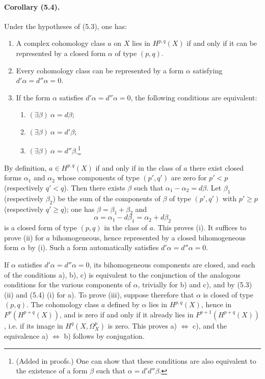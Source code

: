 \documentclass[10pt]{article}
\begin{document}
\paragraph{Corollary (5.4).} Under the hypotheses of (5.3), one has:
\begin{enumerate}[label=(\roman*)]
\item A complex cohomology class $a$ on $X$ lies in $H^{p,q}(X)$ if and only if it can be represented by a closed form $\alpha$ of type $(p,q)$.
\item Every cohomology class can be represented by a form $\alpha$ satisfying $d'\alpha=d''\alpha=0$.
\item If the form $\alpha$ satisfies $d'\alpha=d''\alpha=0$, the following conditions are equivalent:
\begin{enumerate}[label=\alph*)]
\item $(\exists\beta)\ \alpha=d\beta$;
\item $(\exists\beta)\ \alpha=d'\beta$;
\item $(\exists\beta)\ \alpha=d''\beta$.\footnote{(Added in proofs.) One can show that these conditions are also equivalent to the existence of a form $\beta$ such that $\alpha=d'd''\beta$.}
\end{enumerate}
\end{enumerate}
By definition, $a\in H^{p,q}(X)$ if and only if in the class of $a$ there exist closed forms $\alpha_1$ and $\alpha_2$ whose components of type $(p',q')$ are zero for $p'<p$ (respectively $q'<q$). Then there exists $\beta$ such that $\alpha_1-\alpha_2=d\beta$. Let $\beta_1$ (respectively $\beta_2$) be the sum of the components of $\beta$ of type $(p',q')$ with $p'\ge p$ (respectively $q'\ge q$); one has $\beta=\beta_1+\beta_2$ and
\[
\alpha=\alpha_1-d\beta_1=\alpha_2+d\beta_2
\]
is a closed form of type $(p,q)$ in the class of $a$. This proves (i). It suffices to prove (ii) for $a$ bihomogeneous, hence represented by a closed bihomogeneous form $\alpha$ by (i). Such a form automatically satisfies $d'\alpha=d''\alpha=0$.

If $\alpha$ satisfies $d'\alpha=d''\alpha=0$, its bihomogeneous components are closed, and each of the conditions a), b), c) is equivalent to the conjunction of the analogous conditions for the various components of $\alpha$, trivially for b) and c), and by (5.3) (ii) and (5.4) (i) for a). To prove (iii), suppose therefore that $\alpha$ is closed of type $(p,q)$. The cohomology class $a$ defined by $\alpha$ lies in $H^{p,q}(X)$, hence in $F^p(H^{p+q}(X))$, and is zero if and only if it already lies in $F^{p+1}(H^{p+q}(X))$, i.e. if its image in $H^q(X,\Omega_X^p)$ is zero. This proves a) $\Leftrightarrow$ c), and the equivalence a) $\Leftrightarrow$ b) follows by conjugation.
\end{document}
